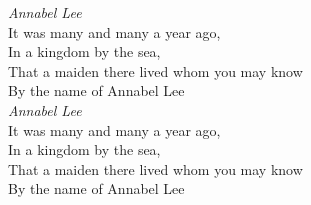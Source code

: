 \documentclass{article}
\begin{document}
 \emph{Annabel Lee}\\
 It was many and many a year ago,\\
 In a kingdom by the sea,\\
 That a maiden there lived whom you may know\\
 By the name of Annabel Lee\\[5mm]


 \emph{Annabel Lee}\\[3mm]
 It was many and many a year ago,\\
 In a kingdom by the sea,\\
 That a maiden there lived whom you may know\\
 By the name of Annabel Lee \linebreak

 
\end{document}
